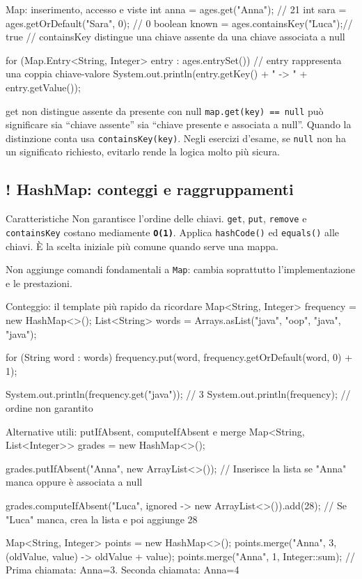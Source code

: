 ﻿\documentclass[10pt,a4paper]{article}
\newcommand{\cmd}[1]{\texttt{#1}}
\newcommand{\complexity}[1]{\textcolor{accent}{\texttt{\textbf{#1}}}}
\DeclareRobustCommand{\exammark}{%
  \texorpdfstring{\textcolor{examred}{\bfseries\Large !}\hspace{.18em}}{! }%
}
\newcommand{\topicsubsection}[1]{\Needspace{10\baselineskip}\subsection{#1}}
\newenvironment{topicblock}{%
  \par\medskip\noindent\begin{minipage}{\textwidth}%
}{%
  \end{minipage}\par\medskip%
}
\begin{document}
\begin{topicblock}
\begin{codebox}{Map: inserimento, accesso e viste}
int anna = ages.get("Anna");             // 21
int sara = ages.getOrDefault("Sara", 0); // 0
boolean known = ages.containsKey("Luca");// true
// containsKey distingue una chiave assente da una chiave associata a null

for (Map.Entry<String, Integer> entry : ages.entrySet()) {
    // entry rappresenta una coppia chiave-valore
    System.out.println(entry.getKey() + " -> " + entry.getValue());
}
\end{codebox}

\begin{examtrap}{get non distingue assente da presente con null}
\cmd{map.get(key) == null} può significare sia ``chiave assente'' sia
``chiave presente e associata a null''. Quando la distinzione conta usa
\cmd{containsKey(key)}. Negli esercizi d'esame, se \cmd{null} non ha un
significato richiesto, evitarlo rende la logica molto più sicura.
\end{examtrap}

\end{topicblock}
\begin{topicblock}
\topicsubsection{\exammark HashMap: conteggi e raggruppamenti}
\begin{difference}{Caratteristiche}
Non garantisce l'ordine delle chiavi. \cmd{get}, \cmd{put},
\cmd{remove} e \cmd{containsKey} costano mediamente \complexity{O(1)}.
Applica \cmd{hashCode()} ed \cmd{equals()} alle chiavi.
È la scelta iniziale più comune quando serve una mappa.

Non aggiunge comandi fondamentali a \cmd{Map}: cambia soprattutto
l'implementazione e le prestazioni.
\end{difference}

\begin{codebox}{Conteggio: il template più rapido da ricordare}
Map<String, Integer> frequency = new HashMap<>();
List<String> words = Arrays.asList("java", "oop", "java", "java");

for (String word : words) {
    frequency.put(word, frequency.getOrDefault(word, 0) + 1);
}

System.out.println(frequency.get("java")); // 3
System.out.println(frequency); // ordine non garantito
\end{codebox}

\begin{codebox}{Alternative utili: putIfAbsent, computeIfAbsent e merge}
Map<String, List<Integer>> grades = new HashMap<>();

grades.putIfAbsent("Anna", new ArrayList<>());
// Inserisce la lista se "Anna" manca oppure è associata a null

grades.computeIfAbsent("Luca", ignored -> new ArrayList<>()).add(28);
// Se "Luca" manca, crea la lista e poi aggiunge 28

Map<String, Integer> points = new HashMap<>();
points.merge("Anna", 3, (oldValue, value) -> oldValue + value);
points.merge("Anna", 1, Integer::sum);
// Prima chiamata: Anna=3. Seconda chiamata: Anna=4
\end{codebox}

\end{topicblock}
\end{document}
